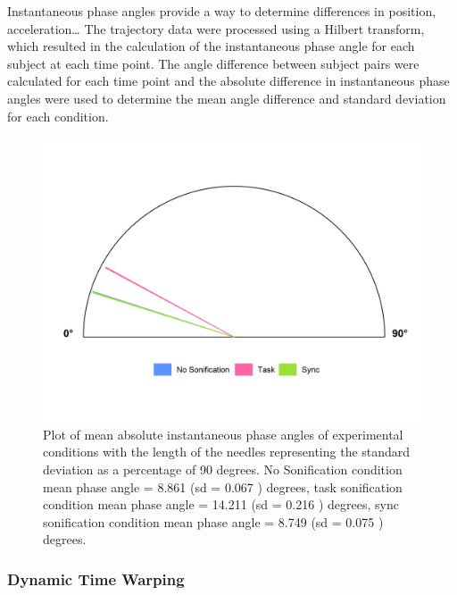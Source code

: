\documentclass[10pt,a4paper,onecolumn]{article}
\begin{document}
Instantaneous phase angles provide a way to determine differences in position, acceleration\ldots{}
The trajectory data were processed using a Hilbert transform, which resulted in the calculation of the instantaneous phase angle for each subject at each time point. The angle difference between subject pairs were calculated for each time point and the absolute difference in instantaneous phase angles were used to determine the mean angle difference and standard deviation for each condition.

\begin{figure}[h]

{\centering \includegraphics[width=1\linewidth]{figures/mean_condition_phase_angles_mean_sd} 

}

\caption{Plot of mean absolute instantaneous phase angles of experimental conditions with the length of the needles representing the standard deviation as a percentage of 90 degrees. No Sonification condition mean phase angle =  8.861 (sd =  0.067 ) degrees, task sonification condition mean phase angle =  14.211 (sd =  0.216 ) degrees, sync sonification condition mean phase angle =  8.749 (sd =  0.075 ) degrees.}\label{fig:mean-instantaneous-phase-angle-circular-plot}
\end{figure}

\hypertarget{dynamic-time-warping}{%
\subsubsection{Dynamic Time Warping}\label{dynamic-time-warping}}
\end{document}
